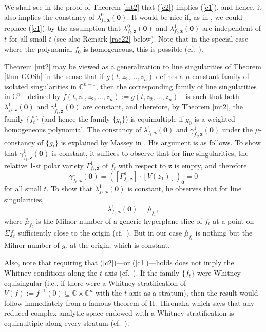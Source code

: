 \documentclass[a4paper,fleqn,11pt]{amsart}
\theoremstyle{definition}
\theoremstyle{remark}
\numberwithin{equation}{section}
\begin{document}
We shall see in the proof of Theorem \ref{mt2} that (\ref{c2}) implies (\ref{c1}), and hence, it also implies the constancy of $\lambda^0_{f_t,\mathbf{z}}(\mathbf{0})$. It would be nice if, as in \cite[Theorem 9.4]{M}, we could replace (\ref{c1}) by the assumption that $\lambda^0_{f_t,\mathbf{z}} (\mathbf{0})$ and $\lambda^1_{f_t,\mathbf{z}} (\mathbf{0})$ are independent of $t$ for all small $t$ (see also Remark \ref{rac22} below). Note that in the special case where the polynomial $f_0$ is homogeneous, this is possible (cf.~\cite{Ey2}).

Theorem \ref{mt2} may be viewed as a generalization to line singularities of Theorem \ref{thm-GOSh} in the sense that if $g(t,z_2,\ldots,z_n)$ defines a $\mu$-constant family of isolated singularities in $\mathbb{C}^{n-1}$, then the corresponding family of line singularities in $\mathbb{C}^{n}$---defined by $f(t,z_1,z_2,\ldots,z_n):=g(t,z_2,\ldots,z_n)$---is such that both $\lambda^1_{f_t,\mathbf{z}} (\mathbf{0})$ and $\gamma^1_{f_t,\mathbf{z}} (\mathbf{0})$ are constant, and therefore, by Theorem \ref{mt2}, the family  $\{f_t\}$ (and hence the family $\{g_t\}$) is equimultiple if $g_0$ is a weighted homogeneous polynomial. The constancy of $\lambda^1_{f_t,\mathbf{z}} (\mathbf{0})$ and $\gamma^1_{f_t,\mathbf{z}} (\mathbf{0})$ under the $\mu$-constancy of $\{g_t\}$ is explained by Massey in \cite[\S 5]{M7}. His argument is as follows. To show that $\gamma^1_{f_t,\mathbf{z}} (\mathbf{0}) $ is constant, it suffices to observe that for line singularities, the relative 1-st polar variety
$\Gamma^1_{f_t,\mathbf{z}}$ of $f_t$ with respect to $\mathbf{z}$ is empty, and therefore
\begin{displaymath}
\gamma^1_{f_t,\mathbf{z}} (\mathbf{0}) = 
([\Gamma^1_{f_t,\mathbf{z}}] \cdot [V(z_1)])_{\mathbf{0}}=0
\end{displaymath}
for all small $t$.
To show that $\lambda^1_{f_t,\mathbf{z}} (\mathbf{0})$ is constant, he observes that for line singularities,
\begin{displaymath}
\lambda^1_{f_t,\mathbf{z}} (\mathbf{0}) = \overset{\circ}{\mu}_{f_t}, 
\end{displaymath}
where $\overset{\circ}{\mu}_{f_t}$ is the Milnor number of a generic hyperplane slice of $f_t$ at a point on $\Sigma f_t$ sufficiently close to the origin (cf.~\cite{L4,M7,M}). But in our case $\overset{\circ}{\mu}_{f_t}$ is nothing but the Milnor number of $g_t$ at the origin, which is constant.  

Also, note that requiring that (\ref{c2})---or (\ref{c1})---holds does not imply the Whitney conditions along the $t$-axis (cf.~\cite[\S 5]{M7}). If the family $\{f_t\}$ were Whitney equisingular (i.e., if there were a Whitney stratification of $V(f):=f^{-1}(0)\subseteq\mathbb{C}\times\mathbb{C}^n$ with the $t$-axis as a stratum), then the result would follow immediately from a famous theorem of H.~Hironaka which says that any reduced complex analytic space endowed with a Whitney stratification  is equimultiple along every stratum (cf.~\cite[Corollary (6.2)]{H}).
\end{document}
